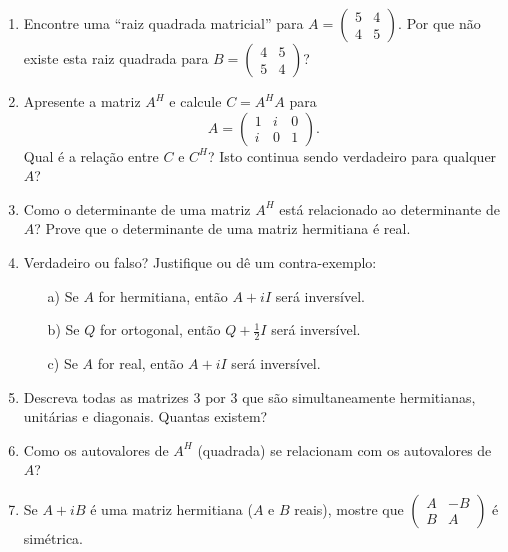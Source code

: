 \documentclass[12pt]{article}
\begin{document}
\begin{enumerate}
\item Encontre uma ``raiz quadrada matricial'' para $A = \begin{pmatrix} 5 & 4\\4 & 5 \end{pmatrix}$. Por que não existe esta raiz quadrada para $B = \begin{pmatrix}4 & 5\\5 & 4\end{pmatrix}$?


\item Apresente a matriz $A^H$ e calcule $C=A^HA$ para
  \begin{equation*}
    A = 
      \begin{pmatrix}
        1 & i & 0\\
        i & 0 & 1
      \end{pmatrix}.
  \end{equation*}
  Qual é a relação entre $C$ e $C^H$? Isto continua sendo verdadeiro para qualquer $A$?

\item Como o determinante de uma matriz $A^H$ está relacionado ao determinante de $A$? Prove que o determinante de uma matriz hermitiana é real.

\item Verdadeiro ou falso? Justifique ou dê um contra-exemplo:
  \begin{itemize}
  \item[a)] Se $A$ for hermitiana, então $A+iI$ será inversível.
  \item[b)] Se $Q$ for ortogonal, então $Q+\frac{1}{2}I$ será inversível.
  \item[c)] Se $A$ for real, então $A+iI$ será inversível.
  \end{itemize}

\item Descreva todas as matrizes 3 por 3 que são simultaneamente hermitianas, unitárias e diagonais. Quantas existem?

\item Como os autovalores de $A^H$ (quadrada) se relacionam com os autovalores de $A$?

\item Se $A+iB$ é uma matriz hermitiana ($A$ e $B$ reais), mostre que $\begin{pmatrix}
A & -B\\ B & A \end{pmatrix}$ é simétrica.


\end{enumerate}
\end{document}
